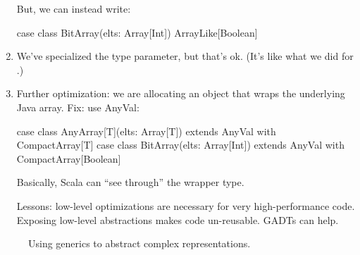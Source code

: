 \begin{instructor}
\begin{enumerate}
But, we can instead write:

\begin{scalacode}
case class BitArray(elts: Array[Int]) ArrayLike[Boolean]
\end{scalacode}

\item We've specialized the type parameter, but that's ok. (It's like what we did
  for .)

\item Further optimization: we are allocating an object that wraps the underlying
  Java array. Fix: use AnyVal:

\begin{scalacode}
  case class AnyArray[T](elts: Array[T]) extends AnyVal with CompactArray[T]
  case class BitArray(elts: Array[Int]) extends AnyVal with CompactArray[Boolean]
\end{scalacode}

Basically, Scala can ``see through'' the wrapper type.

Lessons: low-level optimizations are necessary for very high-performance code. Exposing low-level abstractions makes code un-reusable. GADTs can help.

\end{enumerate}

\end{instructor}

\begin{figure}
\caption{Using generics to abstract complex representations.}
\end{figure}
